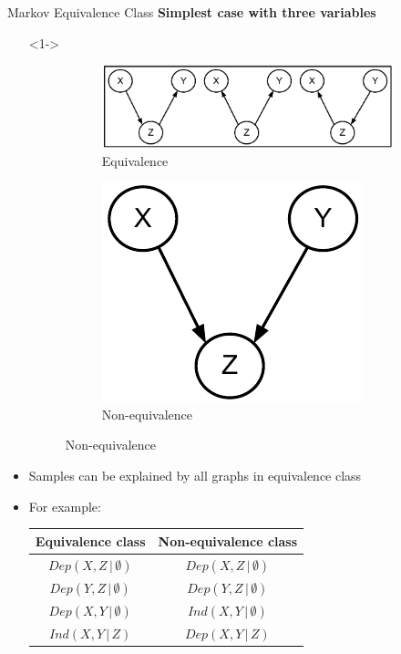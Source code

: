 \begin{frame}{Markov Equivalence Class}
\textbf{Simplest case with three variables}
\begin{itemize}
\item[]<1-> \begin{figure}
\setcounter{subfigure}{0}
			\begin{subfigure}[H]{0.4\textwidth}
			\includegraphics[scale=0.4]{imgs/eqv}
			\caption{Equivalence}
			\end{subfigure}\hfill
			\begin{subfigure}[H]{0.3\textwidth}
			\includegraphics[scale=0.4]{imgs/noneqv}
			\caption{Non-equivalence}
			\end{subfigure}
		\end{figure}
\item<2-> Samples can be explained by all graphs in equivalence class
\item<3-> For example:
\begin{table}
\centering
\begin{tabular}{|c|c|}
\hline
Equivalence class & Non-equivalence class \\\hline
$Dep(X,Z\,|\,\emptyset)$ & $Dep(X,Z\,|\,\emptyset)$\\\hline
$Dep(Y,Z\,|\,\emptyset)$ & $Dep(Y,Z\,|\,\emptyset)$\\\hline
$Dep(X,Y\,|\,\emptyset)$ & \alert{$Ind(X,Y\,|\,\emptyset)$}\\\hline
$Ind(X,Y\,|\,Z)$ & \alert{$Dep(X,Y\,|\,Z)$}\\\hline
\end{tabular}
\end{table}	
\end{itemize}
\end{frame}
